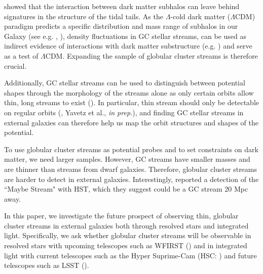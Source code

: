 \documentclass[twocolumn]{aastex62}
\begin{document}
\citet{ibata02} showed that the interaction between dark matter subhalos can leave behind signatures in the structure of the tidal tails. As the $\Lambda$-cold dark matter ($\Lambda$CDM) paradigm predicts a specific distribution and mass range of subhalos in our Galaxy (see e.g. \citealt{bovy17}, \citealt{bonaca19}), density fluctuations in GC stellar streams, can be used as indirect evidence of interactions with dark matter substructure (e.g. \citealt{yoon11}) and serve as a test of $\Lambda$CDM. Expanding the sample of globular cluster streams is therefore crucial. 

Additionally, GC stellar streams can be used to distinguish between potential shapes through the morphology of the streams alone as only certain orbits allow thin, long streams to exist (\citealt{pearson15}). In particular, thin stream should only be detectable on regular orbits (\citealt{price16}, Yavetz et al., {\it in prep.}), and finding GC stellar streams in external galaxies can therefore help us map the orbit structures and shapes of the potential. 

To use globular cluster streams as potential probes and to set constraints on dark matter, we need larger samples. However, GC streams have smaller masses and are thinner than streams from dwarf galaxies. Therefore, globular cluster streams are harder to detect in external galaxies. Interestingly, \citet{abraham18} reported a detection of the ``Maybe Stream" with HST, which they suggest could be a GC stream 20 Mpc away. 


In this paper, we investigate the future prospect of observing thin, globular cluster streams in external galaxies both through resolved stars and integrated light. 
Specifically, we ask whether globular cluster streams will be observable in resolved stars with upcoming telescopes such as WFIRST (\citealt{spergel13}) and in integrated light with current telescopes such as the Hyper Suprime-Cam (HSC: \citealt{miyazaki12}) and future telescopes such as LSST (\citealt{ivezi08}). %
\end{document}
